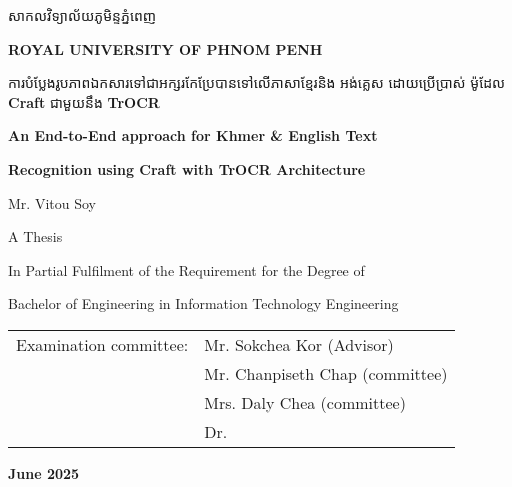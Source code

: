 \begin{titlepage}
    \centering
    \vspace*{1cm}

    \centering
    \begin{minipage}{0.9\textwidth}
        \centering
        {\khmerfont\fontsize{16pt}{20pt}\selectfont សាកលវិទ្យាល័យភូមិន្ទភ្នំពេញ\\[0.6em] \par}
        {\large\bfseries ROYAL UNIVERSITY OF PHNOM PENH\par}
    \end{minipage}
    

    \vspace{2cm}

    \begin{minipage}{0.9\textwidth}
        \centering
        {\khmerfont\fontsize{12pt}{20pt}\selectfont ការបំប្លែងរូបភាពឯកសារទៅជាអក្សរកែប្រែបានទៅលើភាសាខ្មែរនិង អង់គ្លេស ដោយប្រើប្រាស់ ម៉ូដែល {\englishfont\textbf{Craft}} ជាមួយនឹង {\englishfont\textbf{TrOCR}}\\[0.4em]}
        {\englishfont\fontsize{15pt}{20pt}\selectfont\bfseries An End-to-End approach for Khmer \& English Text \par}
        {\englishfont\fontsize{15pt}{20pt}\selectfont\bfseries Recognition using Craft with TrOCR Architecture \par}
    \end{minipage}

    \vspace{3.0cm}

    {\englishfont\fontsize{16pt}{20pt}\selectfont Mr. Vitou Soy\par}

    \vspace{3.0cm}

    {\englishfont\fontsize{16pt}{20pt}\selectfont A Thesis\par}
    \vspace{0.5cm}
    {\large In Partial Fulfilment of the Requirement for the Degree of\par}
    {\large Bachelor of Engineering in Information Technology Engineering\par}
    

    \vspace{2.5cm}

    {\englishfont
    \begin{center}
        \begin{tabular}{ll}
            {Examination committee:} & Mr. Sokchea Kor (Advisor) \\
                                    & Mr. Chanpiseth Chap (committee) \\
                                    & Mrs. Daly Chea (committee)\\
                                    & Dr. \dotfill
        \end{tabular}
    \end{center}
    }

    \vfill
    {\Large\bfseries June 2025\par}
\end{titlepage}

